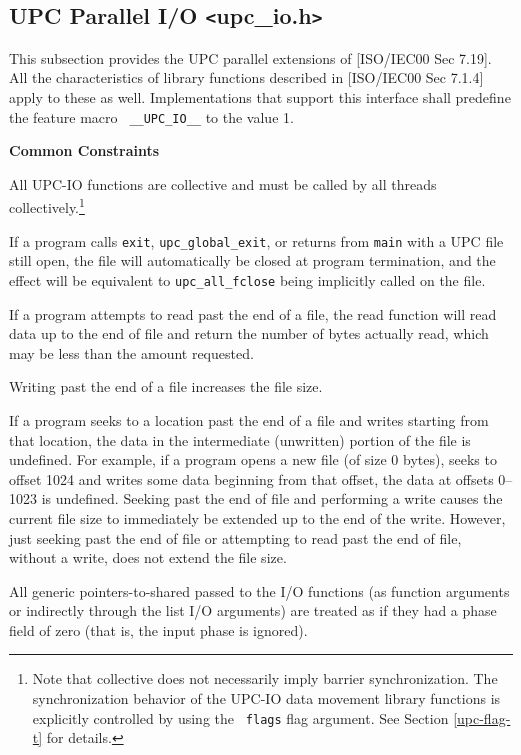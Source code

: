 \subsection{UPC Parallel I/O \texttt{<}upc\_io.h\texttt{>}}

\npf This subsection provides the UPC parallel extensions of [ISO/IEC00 
    Sec 7.19].  All the characteristics of library functions described
    in [ISO/IEC00 Sec 7.1.4] apply to these as well.  Implementations
    that support this interface shall predefine the feature macro {\tt
    \_\_UPC\_IO\_\_} to the value 1.

{\bf Common Constraints}

\np All UPC-IO functions are collective and must be called by all threads collectively.\footnote{Note that 
collective does not necessarily imply barrier synchronization.  The synchronization behavior of the 
UPC-IO data movement library functions is explicitly controlled by using the {\tt
flags} flag argument. See Section \ref{upc-flag-t} for details.}

\np If a program calls {\tt exit}, {\tt upc\_global\_exit}, or returns from {\tt main} with a
UPC file still open, the file will automatically be closed at program
termination, and the effect will be equivalent to {\tt upc\_all\_fclose} being
implicitly called on the file.

\np If a program attempts to read past the end of a file, the read function
will read data up to the end of file and return the number of bytes actually
read, which may be less than the amount requested.

\np Writing past the end of a file increases the file size.

\np If a program seeks to a location past the end of a file and writes
starting from that location, the data in the intermediate (unwritten)
portion of the file is undefined. For example, if a program opens a new file
(of size 0 bytes), seeks to offset 1024 and writes some data beginning from
that offset, the data at offsets 0--1023 is undefined. Seeking past the end
of file and performing a write causes the current file size to immediately
be extended up to the end of the write. However, just seeking past the end
of file or attempting to read past the end of file, without a write, does
not extend the file size.

\np All generic pointers-to-shared passed to the I/O functions (as function
arguments or indirectly through the list I/O arguments) are treated as if
they had a phase field of zero (that is, the input phase is ignored).

